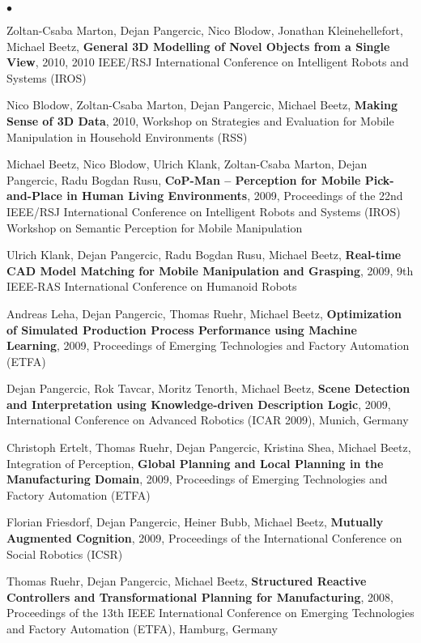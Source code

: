 \documentclass[margin,line]{res}
\newenvironment{list2}{
  \begin{list}{$\bullet$}{%
      \setlength{\itemsep}{0in}
      \setlength{\parsep}{0in} \setlength{\parskip}{0in}
      \setlength{\topsep}{0in} \setlength{\partopsep}{0in} 
      \setlength{\leftmargin}{0.2in}}}{\end{list}}
\begin{document}
\begin{resume}
{\begin{list2}
\item Zoltan-Csaba Marton, Dejan Pangercic, Nico Blodow, Jonathan Kleinehellefort, Michael Beetz,\textbf{ General 3D Modelling of Novel Objects from a Single View}, 2010, 2010 IEEE/RSJ International Conference on Intelligent Robots and Systems (IROS)\\
\item Nico Blodow, Zoltan-Csaba Marton, Dejan Pangercic, Michael Beetz, \textbf{Making Sense of 3D Data}, 2010, Workshop on Strategies and Evaluation for Mobile Manipulation in Household Environments (RSS)\\
\item Michael Beetz, Nico Blodow, Ulrich Klank, Zoltan-Csaba Marton, Dejan Pangercic, Radu Bogdan Rusu, \textbf{CoP-Man -- Perception for Mobile Pick-and-Place in Human Living Environments}, 2009, Proceedings of the 22nd IEEE/RSJ International Conference on Intelligent Robots and Systems (IROS) Workshop on Semantic Perception for Mobile Manipulation\\
\item Ulrich Klank, Dejan Pangercic, Radu Bogdan Rusu, Michael Beetz, \textbf{Real-time CAD Model Matching for Mobile Manipulation and Grasping}, 2009, 9th IEEE-RAS International Conference on Humanoid Robots\\
\item Andreas Leha, Dejan Pangercic, Thomas Ruehr, Michael Beetz, \textbf{Optimization of Simulated Production Process Performance using Machine Learning}, 2009, Proceedings of Emerging Technologies and Factory Automation (ETFA)\\
\item Dejan Pangercic,  Rok Tavcar, Moritz Tenorth, Michael Beetz, \textbf{Scene Detection and Interpretation using Knowledge-driven Description Logic}, 2009, International Conference on Advanced Robotics (ICAR 2009), Munich, Germany \\
\item Christoph Ertelt, Thomas Ruehr, Dejan Pangercic, Kristina Shea, Michael Beetz, Integration of Perception, \textbf{Global Planning and Local Planning in the Manufacturing Domain}, 2009, Proceedings of Emerging Technologies and Factory Automation (ETFA)\\
\item Florian Friesdorf, Dejan Pangercic, Heiner Bubb, Michael Beetz, \textbf{Mutually Augmented Cognition}, 2009, Proceedings of the International Conference on Social Robotics (ICSR)\\
\item Thomas Ruehr,     Dejan Pangercic,     Michael Beetz,     \textbf{Structured Reactive Controllers and Transformational Planning for Manufacturing},   2008,  Proceedings of the 13th IEEE International Conference on Emerging Technologies and Factory Automation (ETFA), Hamburg, Germany\\

\end{list2}}
\end{resume}
\end{document}
